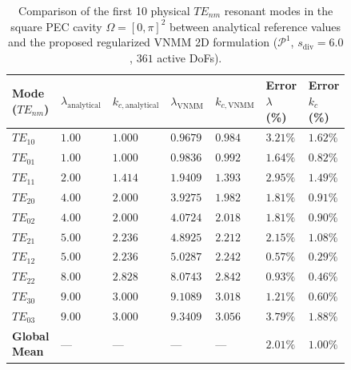 \documentclass[preprint,12pt]{elsarticle}
\begin{document}
\begin{table}[!ht]
\centering
\footnotesize
\setlength{\tabcolsep}{3pt}
\caption{Comparison of the first 10 physical $TE_{nm}$ resonant modes in the square PEC cavity $\Omega = [0, \pi]^2$ between analytical reference values and the proposed regularized VNMM 2D formulation ($\mathcal{P}^1$, $s_{\mathrm{div}} = 6.0$, $361$ active DoFs).}
\label{tab:cavity_eigenvalues_base_case}
\begin{tabularx}{\linewidth}{@{}
>{\centering\arraybackslash}p{0.16\linewidth}
>{\centering\arraybackslash}p{0.14\linewidth}
>{\centering\arraybackslash}p{0.14\linewidth}
>{\centering\arraybackslash}p{0.14\linewidth}
>{\centering\arraybackslash}p{0.12\linewidth}
>{\centering\arraybackslash}p{0.14\linewidth}
>{\centering\arraybackslash}X
@{}}
\toprule
\textbf{Mode ($TE_{nm}$)} & $\lambda_{\mathrm{analytical}}$ & $k_{c, \mathrm{analytical}}$ & $\lambda_{\mathrm{VNMM}}$ & $k_{c, \mathrm{VNMM}}$ & \textbf{Error $\lambda$ (\%)} & \textbf{Error $k_c$ (\%)} \\
\midrule
$TE_{10}$ & $1.00$ & $1.000$ & $0.9679$ & $0.984$ & $3.21\%$ & $\mathbf{1.62\%}$ \\
$TE_{01}$ & $1.00$ & $1.000$ & $0.9836$ & $0.992$ & $1.64\%$ & $\mathbf{0.82\%}$ \\
$TE_{11}$ & $2.00$ & $1.414$ & $1.9409$ & $1.393$ & $2.95\%$ & $\mathbf{1.49\%}$ \\
$TE_{20}$ & $4.00$ & $2.000$ & $3.9275$ & $1.982$ & $1.81\%$ & $\mathbf{0.91\%}$ \\
$TE_{02}$ & $4.00$ & $2.000$ & $4.0724$ & $2.018$ & $1.81\%$ & $\mathbf{0.90\%}$ \\
$TE_{21}$ & $5.00$ & $2.236$ & $4.8925$ & $2.212$ & $2.15\%$ & $\mathbf{1.08\%}$ \\
$TE_{12}$ & $5.00$ & $2.236$ & $5.0287$ & $2.242$ & $0.57\%$ & $\mathbf{0.29\%}$ \\
$TE_{22}$ & $8.00$ & $2.828$ & $8.0743$ & $2.842$ & $0.93\%$ & $\mathbf{0.46\%}$ \\
$TE_{30}$ & $9.00$ & $3.000$ & $9.1089$ & $3.018$ & $1.21\%$ & $\mathbf{0.60\%}$ \\
$TE_{03}$ & $9.00$ & $3.000$ & $9.3409$ & $3.056$ & $3.79\%$ & $\mathbf{1.88\%}$ \\
\midrule
\textbf{Global Mean} & --- & --- & --- & --- & $\mathbf{2.01\%}$ & $\mathbf{1.00\%}$ \\
\bottomrule
\end{tabularx}
\end{table}
\end{document}
